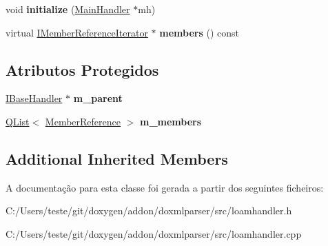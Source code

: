 \begin{DoxyCompactItemize}
\item 
\hypertarget{class_list_of_all_members_handler_a477d68af87dc751b2c70936c91980873}{void {\bfseries initialize} (\hyperlink{class_main_handler}{Main\-Handler} $\ast$mh)}\label{class_list_of_all_members_handler_a477d68af87dc751b2c70936c91980873}

\item 
\hypertarget{class_list_of_all_members_handler_a200d07c3abf67b299e7945b68c91328a}{virtual \hyperlink{class_i_member_reference_iterator}{I\-Member\-Reference\-Iterator} $\ast$ {\bfseries members} () const }\label{class_list_of_all_members_handler_a200d07c3abf67b299e7945b68c91328a}

\end{DoxyCompactItemize}
\subsection*{Atributos Protegidos}
\begin{DoxyCompactItemize}
\item 
\hypertarget{class_list_of_all_members_handler_aa0a1ac08246d69ae9f7569f843516fcf}{\hyperlink{class_i_base_handler}{I\-Base\-Handler} $\ast$ {\bfseries m\-\_\-parent}}\label{class_list_of_all_members_handler_aa0a1ac08246d69ae9f7569f843516fcf}

\item 
\hypertarget{class_list_of_all_members_handler_a71e6a4255ea1128db9c65fa71fe4c9b5}{\hyperlink{class_q_list}{Q\-List}$<$ \hyperlink{class_member_reference}{Member\-Reference} $>$ {\bfseries m\-\_\-members}}\label{class_list_of_all_members_handler_a71e6a4255ea1128db9c65fa71fe4c9b5}

\end{DoxyCompactItemize}
\subsection*{Additional Inherited Members}


A documentação para esta classe foi gerada a partir dos seguintes ficheiros\-:\begin{DoxyCompactItemize}
\item 
C\-:/\-Users/teste/git/doxygen/addon/doxmlparser/src/loamhandler.\-h\item 
C\-:/\-Users/teste/git/doxygen/addon/doxmlparser/src/loamhandler.\-cpp\end{DoxyCompactItemize}
